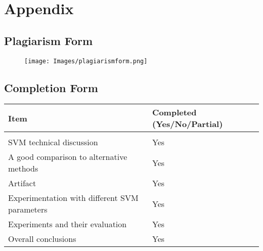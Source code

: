 \chapter*{Appendix}

\section*{Plagiarism Form}
\begin{figure}[H]
	\centering
	\texttt{[image: Images/plagiarismform.png]}
\end{figure}

\pagebreak

\section*{Completion Form}
\begin{table}[h]
	\begin{tabular}{|l|l|}
		\hline
		\textbf{Item}                                     & \textbf{Completed} (Yes/No/Partial) \\ \hline
		&                            \\ \hline
		SVM technical discussion     & Yes                        \\ \hline
		A good comparison to alternative methods                  & Yes                        \\ \hline
		Artifact                  & Yes                        \\ \hline
		Experimentation with different SVM parameters                  & Yes                        \\ \hline
		Experiments and their evaluation & Yes                        \\ \hline
		Overall conclusions           & Yes                        \\ \hline
	\end{tabular}
\end{table}